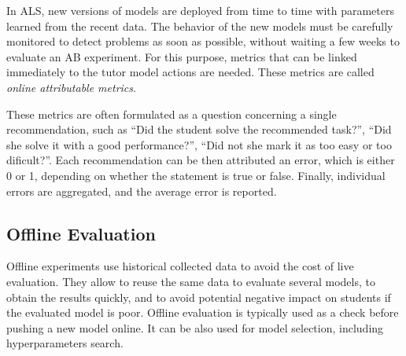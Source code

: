 
In ALS, new versions of models are deployed from time to time
  with parameters learned from the recent data.
The behavior of the new models must be carefully monitored
  to detect problems as soon as possible,
  without waiting a few weeks to evaluate an AB experiment.
For this purpose, metrics that can be linked immediately
  to the tutor model actions are needed.
These metrics are called \emph{online attributable metrics}.  %

These metrics are often formulated as a question concerning a single recommendation,
such as
``Did the student solve the recommended task?'',
``Did she solve it with a good performance?'',
``Did not she mark it as too easy or too dificult?''.
Each recommendation can be then attributed an error, which is either 0 or 1, depending
on whether the statement is true or false.
Finally, individual errors are aggregated, and the average error is reported.





\subsection{Offline Evaluation}

Offline experiments use historical collected data
  to avoid the cost of live evaluation.
They allow to reuse the same data to evaluate several models,
  to obtain the results quickly,
  and to avoid potential negative impact on students if the evaluated model is poor.
Offline evaluation is typically used as a check before pushing
  a new model online.
It can be also used for model selection,
  including hyperparameters search.

